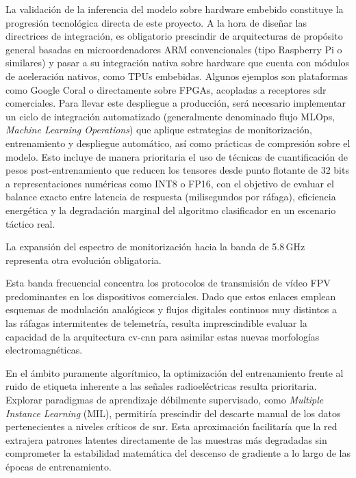 La validación de la inferencia del modelo sobre hardware embebido constituye la progresión tecnológica directa de este proyecto. A la hora de diseñar las directrices de integración, es obligatorio prescindir de arquitecturas de propósito general basadas en microordenadores ARM convencionales (tipo Raspberry Pi o similares) y pasar a su integración nativa sobre hardware que cuenta con módulos de aceleración nativos, como TPUs embebidas. Algunos ejemplos son plataformas como Google Coral o directamente sobre FPGAs, acopladas a receptores \gls{sdr} comerciales. Para llevar este despliegue a producción, será necesario implementar un ciclo de integración automatizado (generalmente denominado flujo MLOps, \textit{Machine Learning Operations}) que aplique estrategias de monitorización, entrenamiento y despliegue automático, así como prácticas de compresión sobre el modelo. Esto incluye de manera prioritaria el uso de técnicas de cuantificación de pesos post-entrenamiento que reducen los tensores desde punto flotante de 32 bits a representaciones numéricas como INT8 o FP16, con el objetivo de evaluar el balance exacto entre latencia de respuesta (milisegundos por ráfaga), eficiencia energética y la degradación marginal del algoritmo clasificador en un escenario táctico real.

La expansión del espectro de monitorización hacia la banda de 5.8\,GHz representa otra evolución obligatoria.

Esta banda frecuencial concentra los protocolos de transmisión de vídeo FPV predominantes en los dispositivos comerciales. Dado que estos enlaces emplean esquemas de modulación analógicos y flujos digitales continuos muy distintos a las ráfagas intermitentes de telemetría, resulta imprescindible evaluar la capacidad de la arquitectura \gls{cv-cnn} para asimilar estas nuevas morfologías electromagnéticas.

En el ámbito puramente algorítmico, la optimización del entrenamiento frente al ruido de etiqueta inherente a las señales radioeléctricas resulta prioritaria. Explorar paradigmas de aprendizaje débilmente supervisado, como \textit{Multiple Instance Learning} (MIL), permitiría prescindir del descarte manual de los datos pertenecientes a niveles críticos de \gls{snr}. Esta aproximación facilitaría que la red extrajera patrones latentes directamente de las muestras más degradadas sin comprometer la estabilidad matemática del descenso de gradiente a lo largo de las épocas de entrenamiento.


